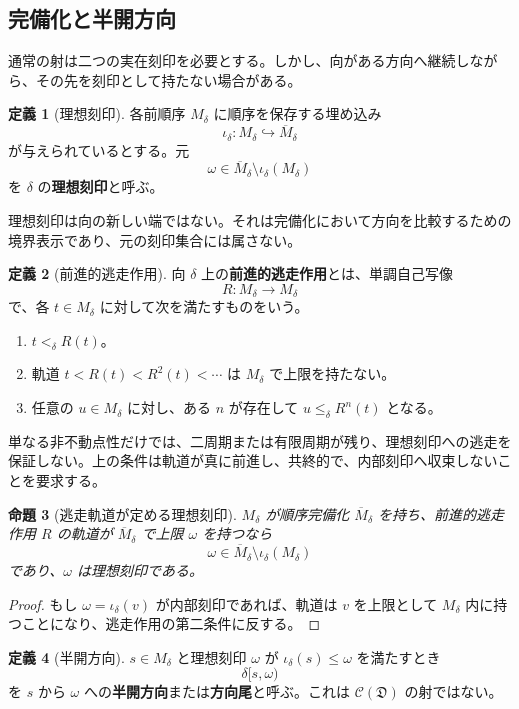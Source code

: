 \documentclass[a4paper,11pt]{ltjsarticle}
\theoremstyle{definition}
\newtheorem{definition}{定義}[section]
\theoremstyle{plain}
\newtheorem{proposition}[definition]{命題}
\begin{document}
\subsection{完備化と半開方向}

通常の射は二つの実在刻印を必要とする。しかし、向がある方向へ継続しながら、その先を刻印として持たない場合がある。

\begin{definition}[理想刻印]
各前順序 $M_\delta$ に順序を保存する埋め込み
\[
 \iota_\delta:M_\delta\hookrightarrow\overline M_\delta
\]
が与えられているとする。元
\[
 \omega\in
 \overline M_\delta\setminus\iota_\delta(M_\delta)
\]
を $\delta$ の\textbf{理想刻印}と呼ぶ。
\end{definition}

理想刻印は向の新しい端ではない。それは完備化において方向を比較するための境界表示であり、元の刻印集合には属さない。

\begin{definition}[前進的逃走作用]
向 $\delta$ 上の\textbf{前進的逃走作用}とは、単調自己写像
\[
 R:M_\delta\longrightarrow M_\delta
\]
で、各 $t\in M_\delta$ に対して次を満たすものをいう。
\begin{enumerate}
 \item $t<_\delta R(t)$。
 \item 軌道 $t<R(t)<R^2(t)<\cdots$ は $M_\delta$ で上限を持たない。
 \item 任意の $u\in M_\delta$ に対し、ある $n$ が存在して $u\leq_\delta R^n(t)$ となる。
\end{enumerate}
\end{definition}

単なる非不動点性だけでは、二周期または有限周期が残り、理想刻印への逃走を保証しない。上の条件は軌道が真に前進し、共終的で、内部刻印へ収束しないことを要求する。

\begin{proposition}[逃走軌道が定める理想刻印]
$M_\delta$ が順序完備化 $\overline M_\delta$ を持ち、前進的逃走作用 $R$ の軌道が $\overline M_\delta$ で上限 $\omega$ を持つなら
\[
 \omega\in
 \overline M_\delta\setminus\iota_\delta(M_\delta)
\]
であり、$\omega$ は理想刻印である。
\end{proposition}

\begin{proof}
もし $\omega=\iota_\delta(v)$ が内部刻印であれば、軌道は $v$ を上限として $M_\delta$ 内に持つことになり、逃走作用の第二条件に反する。
\end{proof}

\begin{definition}[半開方向]
$s\in M_\delta$ と理想刻印 $\omega$ が $\iota_\delta(s)\leq\omega$ を満たすとき
\[
 \delta[s,\omega)
\]
を $s$ から $\omega$ への\textbf{半開方向}または\textbf{方向尾}と呼ぶ。これは $\mathcal C(\mathfrak D)$ の射ではない。
\end{definition}
\end{document}
